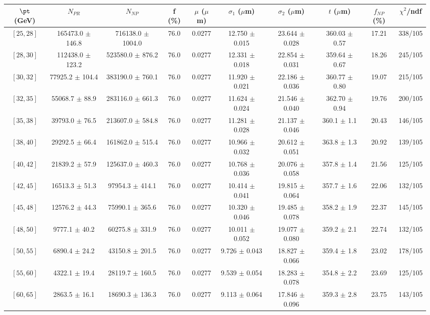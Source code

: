 \begin{tabular}{c||c|c|c|c|c|c|c||c|c}
$\pt$ (GeV) & $N_{PR}$ & $N_{NP}$ & f (\%) & $\mu$ ($\mu$m) & $\sigma_1$ ($\mu$m) & $\sigma_2$ ($\mu$m)  & $t$ ($\mu$m) & $f_{NP}$ (\%) & $\chi^2$/ndf \\
\hline
$[25, 28]$ & 165473.0 $\pm$ 146.8 & 716138.0 $\pm$ 1004.0 & 76.0 & 0.0277 & 12.750 $\pm$ 0.015 & 23.644 $\pm$ 0.028 & 360.03 $\pm$ 0.57 & 17.21 & 338/105\\
$[28, 30]$ & 112438.0 $\pm$ 123.2 & 523580.0 $\pm$ 876.2 & 76.0 & 0.0277 & 12.331 $\pm$ 0.018 & 22.854 $\pm$ 0.031 & 359.64 $\pm$ 0.67 & 18.26 & 245/105\\
$[30, 32]$ & 77925.2 $\pm$ 104.4 & 383190.0 $\pm$ 760.1 & 76.0 & 0.0277 & 11.920 $\pm$ 0.021 & 22.186 $\pm$ 0.036 & 360.77 $\pm$ 0.80 & 19.07 & 215/105\\
$[32, 35]$ & 55068.7 $\pm$ 88.9 & 283116.0 $\pm$ 661.3 & 76.0 & 0.0277 & 11.624 $\pm$ 0.024 & 21.546 $\pm$ 0.040 & 362.70 $\pm$ 0.94 & 19.76 & 200/105\\
$[35, 38]$ & 39793.0 $\pm$ 76.5 & 213607.0 $\pm$ 584.8 & 76.0 & 0.0277 & 11.281 $\pm$ 0.028 & 21.137 $\pm$ 0.046 & 360.1 $\pm$ 1.1 & 20.43 & 146/105\\
$[38, 40]$ & 29292.5 $\pm$ 66.4 & 161862.0 $\pm$ 515.4 & 76.0 & 0.0277 & 10.966 $\pm$ 0.032 & 20.612 $\pm$ 0.051 & 363.8 $\pm$ 1.3 & 20.92 & 139/105\\
$[40, 42]$ & 21839.2 $\pm$ 57.9 & 125637.0 $\pm$ 460.3 & 76.0 & 0.0277 & 10.768 $\pm$ 0.036 & 20.076 $\pm$ 0.058 & 357.8 $\pm$ 1.4 & 21.56 & 125/105\\
$[42, 45]$ & 16513.3 $\pm$ 51.3 & 97954.3 $\pm$ 414.1 & 76.0 & 0.0277 & 10.414 $\pm$ 0.041 & 19.815 $\pm$ 0.064 & 357.7 $\pm$ 1.6 & 22.06 & 132/105\\
$[45, 48]$ & 12576.2 $\pm$ 44.3 & 75990.1 $\pm$ 365.6 & 76.0 & 0.0277 & 10.320 $\pm$ 0.046 & 19.485 $\pm$ 0.078 & 358.2 $\pm$ 1.9 & 22.37 & 145/105\\
$[48, 50]$ & 9777.1 $\pm$ 40.2 & 60275.8 $\pm$ 331.9 & 76.0 & 0.0277 & 10.011 $\pm$ 0.052 & 19.077 $\pm$ 0.080 & 359.2 $\pm$ 2.1 & 22.74 & 132/105\\
$[50, 55]$ & 6890.4 $\pm$ 24.2 & 43150.8 $\pm$ 201.5 & 76.0 & 0.0277 & 9.726 $\pm$ 0.043 & 18.827 $\pm$ 0.066 & 359.4 $\pm$ 1.8 & 23.02 & 178/105\\
$[55, 60]$ & 4322.1 $\pm$ 19.4 & 28119.7 $\pm$ 160.5 & 76.0 & 0.0277 & 9.539 $\pm$ 0.054 & 18.283 $\pm$ 0.078 & 354.8 $\pm$ 2.2 & 23.69 & 125/105\\
$[60, 65]$ & 2863.5 $\pm$ 16.1 & 18690.3 $\pm$ 136.3 & 76.0 & 0.0277 & 9.113 $\pm$ 0.064 & 17.846 $\pm$ 0.096 & 359.3 $\pm$ 2.8 & 23.75 & 143/105\\

\end{tabular}
